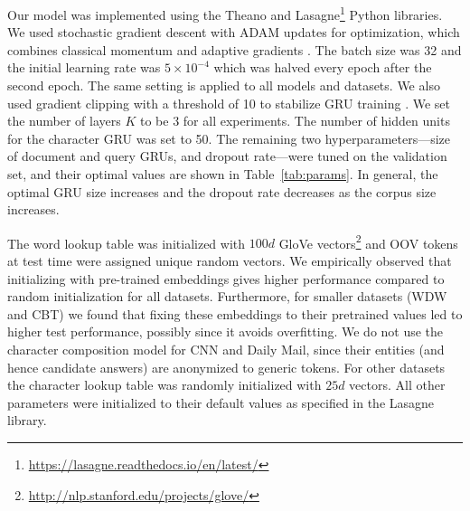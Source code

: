 \documentclass[11pt,a4paper]{article}
\begin{document}
Our model was implemented using the Theano \citep{2016arXiv160502688short} and Lasagne\footnote{\scriptsize \url{https://lasagne.readthedocs.io/en/latest/}} Python libraries. We used stochastic gradient descent with ADAM updates for optimization, which combines classical momentum and adaptive gradients \citep{kingma2014adam}. The batch size was 32 and the initial learning rate was $5\times 10^{-4}$ which was halved every epoch after the second epoch.
The same setting is applied to all models and datasets. We also used gradient clipping with a threshold of 10 to stabilize GRU training \citep{pascanu2012difficulty}.
We set the number of layers $K$ to be $3$ for all experiments.
The number of hidden units for the character GRU was set to 50.
The remaining two hyperparameters---size of document and query GRUs, and dropout rate---were tuned on the validation set, and their optimal values are shown in Table~\ref{tab:params}. In general, the optimal GRU size increases and the dropout rate decreases as the corpus size increases.

The word lookup table was initialized with $100d$ GloVe vectors\footnote{\scriptsize \url{http://nlp.stanford.edu/projects/glove/}} \citep{pennington2014glove} and OOV tokens at test time were assigned unique random vectors. We empirically observed that initializing with pre-trained embeddings gives higher performance compared to random initialization for all datasets. Furthermore, for smaller datasets (WDW and CBT) we found that fixing these embeddings to their pretrained values led to higher test performance, possibly since it avoids overfitting. We do not use the character composition model for CNN and Daily Mail, since their entities (and hence candidate answers) are anonymized to generic tokens. For other datasets the character lookup table was randomly initialized with $25d$ vectors. All other parameters were initialized to their default values as specified in the Lasagne library.
\end{document}
